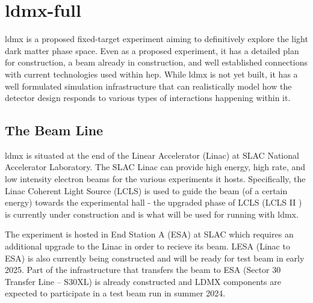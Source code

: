 \chapter{\gls{ldmx-full}}
\label{chapter:ldmx:experiment}

\gls{ldmx} is a proposed fixed-target experiment aiming to definitively explore
the light dark matter phase space. Even as a proposed experiment, it has a detailed
plan for construction, a beam already in construction, and well established connections
with current technologies used within \gls{hep}. While \gls{ldmx} is not yet built,
it has a well formulated simulation infrastructure that can realistically model
how the detector design responds to various types of interactions happening within it.

\section{The Beam Line}
\gls{ldmx} is situated at the end of the Linear Accelerator (Linac) at SLAC National Accelerator
Laboratory. The SLAC Linac can provide high energy, high rate, and low intensity electron beams for
the various experiments it hosts. Specifically, the Linac Coherent Light Source (LCLS) is
used to guide the beam (of a certain energy) towards the experimental hall - the upgraded
phase of LCLS (LCLS II \cite{lcls-ii}) is currently under construction and is what will
be used for running with \gls{ldmx}.

The experiment is hosted in End Station A (ESA) at SLAC which requires an additional upgrade to the
Linac in order to recieve its beam. LESA (Linac to ESA) \cite{lesa-design} is also currently being
constructed and will be ready for test beam in early 2025. Part of the infrastructure that
transfers the beam to ESA (Sector 30 Transfer Line -- S30XL) is already constructed and LDMX
components are expected to participate in a test beam run in summer 2024.

